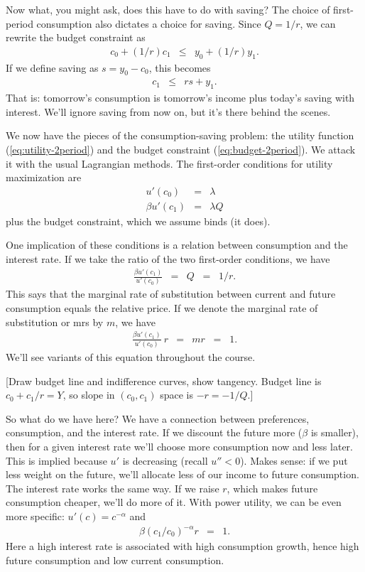 Now what, you might ask, does this have to do with saving?
The choice of first-period consumption also dictates a choice for saving.
Since $Q = 1/r$, we can rewrite the budget constraint as
\begin{eqnarray*}
    c_0 + (1/r) c_1 &\leq& y_0 + (1/r) y_1 .
\end{eqnarray*}
If we define saving as $s = y_0 - c_0$,
this becomes
\begin{eqnarray*}
    c_1  &\leq& r s +  y_1 .
\end{eqnarray*}
That is:  tomorrow's consumption is tomorrow's income
plus today's saving with interest.
We'll ignore saving from now on, but it's there behind the scenes.

We now have the pieces of the consumption-saving problem:
the utility function (\ref{eq:utility-2period})
and the budget constraint (\ref{eq:budget-2period}).
We attack it with the usual Lagrangian methods.
The first-order conditions for utility maximization are
\begin{eqnarray*}
        u'(c_0)  &=& \lambda  \\
       \beta u'(c_1)  &=& \lambda Q
\end{eqnarray*}
plus the budget constraint, which we assume binds (it does).

One implication of these conditions is a relation
between consumption and the interest rate.
If we take the ratio of the two first-order conditions,
we have
\begin{eqnarray*}
       \frac {\beta u'(c_1)}{u'(c_0)}  &=& Q \;\;=\;\; 1/r.
\end{eqnarray*}
This says that the marginal rate of substitution
between current and future consumption equals
the relative price.
If we denote the marginal rate of substitution or mrs by $m$, we have
\begin{eqnarray}
       \frac{\beta u'(c_1)}{u'(c_0)} \ r  &=& m r \;\;=\;\;  1 .
       \label{eq:euler-deterministic}
\end{eqnarray}
We'll see variants of this equation throughout the course.

[Draw budget line and indifference curves, show tangency.
Budget line is $c_0 + c_1/r = Y$, so slope in $(c_0,c_1)$ space
is $-r = - 1/Q$.]

So what do we have here?  We have a connection between
preferences, consumption, and the interest rate.
If we discount the future more ($\beta$ is smaller),
then for a given interest rate we'll choose
more consumption now and less later.
This is implied because $u'$ is decreasing (recall $u''<0$).
Makes sense:  if we put less weight on the future,
we'll allocate less of our income to future consumption.
The interest rate works the same way.
If we raise $r$, which makes future consumption cheaper,
we'll do more of it.
With power utility, we can be even more specific:
$u'(c) = c^{-\alpha}$ and
\begin{eqnarray*}
       \beta (c_1/c_0)^{-\alpha}  r  &=& 1 .
\end{eqnarray*}
Here a high interest rate is associated with
high consumption growth,
hence high future consumption and low current consumption.


